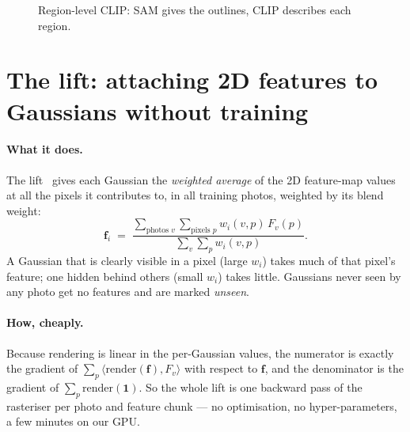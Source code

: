 \documentclass[11pt,a4paper]{article}
\newcommand{\vect}[1]{\mathbf{#1}}
\begin{document}
\begin{figure}[ht]
\centering
{}
\caption{Region-level CLIP: SAM gives the outlines, CLIP describes each region.}
\end{figure}

\section{The lift: attaching 2D features to Gaussians without training}
\label{sec:lift}

\paragraph{What it does.} The lift~\cite{occam,ludvig} gives each Gaussian the \emph{weighted average} of the 2D
feature-map values at all the pixels it contributes to, in all training photos, weighted by its blend weight:
\begin{equation}
  \vect{f}_i \;=\; \frac{\sum_{\text{photos } v}\sum_{\text{pixels } p} w_i(v,p)\, F_v(p)}
                         {\sum_{v}\sum_{p} w_i(v,p)} .
\end{equation}
A Gaussian that is clearly visible in a pixel (large $w_i$) takes much of that pixel's feature; one hidden behind
others (small $w_i$) takes little. Gaussians never seen by any photo get no features and are marked \emph{unseen}.

\paragraph{How, cheaply.} Because rendering is linear in the per-Gaussian values, the numerator is exactly the
gradient of $\sum_p \langle \mathrm{render}(\vect{f}), F_v \rangle$ with respect to $\vect{f}$, and the denominator
is the gradient of $\sum_p \mathrm{render}(\vect{1})$. So the whole lift is one backward pass of the rasteriser per
photo and feature chunk --- no optimisation, no hyper-parameters, a few minutes on our GPU.
\end{document}
